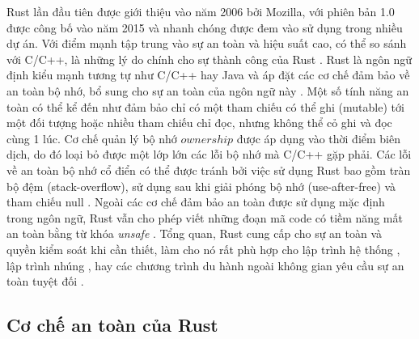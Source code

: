 Rust lần đầu tiên được giới thiệu vào năm 2006 bởi Mozilla, với phiên bản 1.0 được công bố vào năm 2015 và nhanh chóng được đem vào sử dụng trong nhiều dự án.
Với điểm mạnh tập trung vào sự an toàn và hiệu suất cao, có thể so sánh với C/C++, là những lý do chính cho sự thành công của Rust \cite{je2020scientists,stackoverflowStackOverflow}.
Rust là ngôn ngữ định kiểu mạnh tương tự như C/C++ hay Java và áp đặt các cơ chế đảm bảo về an toàn bộ nhớ, bổ sung cho sự an toàn của ngôn ngữ này \cite{rustlangRustProgramming}.
Một số tính năng an toàn có thể kể đến như đảm bảo chỉ có một tham chiếu có thể ghi (mutable) tới một đối tượng hoặc nhiều tham chiếu chỉ đọc, nhưng không thể cỏ ghi và đọc cùng 1 lúc.
Cơ chế quản lý bộ nhớ $ownership$ được áp dụng vào thời điểm biên dịch, do đó loại bỏ được một lớp lớn các lỗi bộ nhớ mà C/C++ gặp phải.
Các lỗi về an toàn bộ nhớ cổ điển có thể được tránh bởi việc sử dụng Rust bao gồm tràn bộ đệm (stack-overflow), sử dụng sau khi giải phóng bộ nhớ (use-after-free) và tham chiếu null \cite{googleblogMemorySafe}.
Ngoài các cơ chế đảm bảo an toàn được sử dụng mặc định trong ngôn ngữ, Rust vẫn cho phép viết những đoạn mã code có tiềm năng mất an toàn bằng từ khóa \textit{unsafe} \cite{rustlangRustProgramming}.
Tổng quan, Rust cung cấp cho sự an toàn và quyền kiểm soát khi cần thiết, làm cho nó rất phù hợp cho lập trình hệ thống \cite{jung2021safe}, lập trình nhúng \cite{sharma2023rust}, hay các chương trình du hành ngoài không gian yêu cầu sự an toàn tuyệt đối \cite{seidel2024bringing}.

\subsection{Cơ chế an toàn của Rust}


